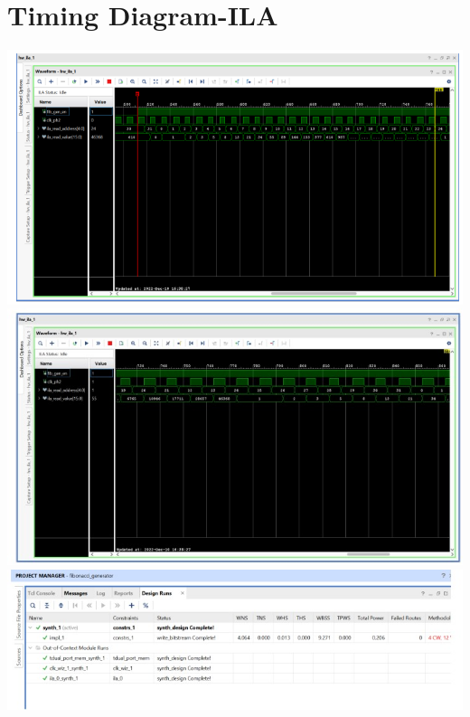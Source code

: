 \documentclass{article}
\begin{document}
\section{Timing Diagram-ILA}
\includegraphics[width=1\columnwidth]{figs/6.jpeg}
\includegraphics[width=1\columnwidth]{figs/7.jpeg}
\includegraphics[width=1\columnwidth]{figs/8.jpeg}
\end{document}
